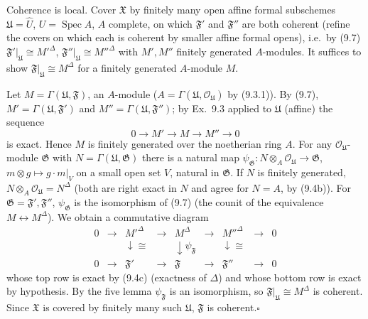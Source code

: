\documentclass[11pt]{article}
\begin{document}
\pf
Coherence is local. Cover $\mathfrak X$ by finitely many open affine formal subschemes $\mathfrak U=\widehat U$, $U=\operatorname{Spec}A$, $A$ complete, on which $\mathfrak F'$ and $\mathfrak F''$ are both coherent (refine the covers on which each is coherent by smaller affine formal opens), i.e.\ by (9.7) $\mathfrak F'|_{\mathfrak U}\cong M'^\Delta$, $\mathfrak F''|_{\mathfrak U}\cong M''^\Delta$ with $M',M''$ finitely generated $A$-modules. It suffices to show $\mathfrak F|_{\mathfrak U}\cong M^\Delta$ for a finitely generated $A$-module $M$.

Let $M=\Gamma(\mathfrak U,\mathfrak F)$, an $A$-module ($A=\Gamma(\mathfrak U,\mathcal O_{\mathfrak U})$ by (9.3.1)). By (9.7), $M'=\Gamma(\mathfrak U,\mathfrak F')$ and $M''=\Gamma(\mathfrak U,\mathfrak F'')$; by Ex.~9.3 applied to $\mathfrak U$ (affine) the sequence
\[0\to M'\to M\to M''\to0\]
is exact. Hence $M$ is finitely generated over the noetherian ring $A$. For any $\mathcal O_{\mathfrak U}$-module $\mathfrak G$ with $N=\Gamma(\mathfrak U,\mathfrak G)$ there is a natural map $\psi_{\mathfrak G}:N\otimes_A\mathcal O_{\mathfrak U}\to\mathfrak G$, $m\otimes g\mapsto g\cdot m|_V$ on a small open set $V$, natural in $\mathfrak G$. If $N$ is finitely generated, $N\otimes_A\mathcal O_{\mathfrak U}=N^\Delta$ (both are right exact in $N$ and agree for $N=A$, by (9.4b)). For $\mathfrak G=\mathfrak F',\mathfrak F''$, $\psi_{\mathfrak G}$ is the isomorphism of (9.7) (the counit of the equivalence $M\leftrightarrow M^\Delta$). We obtain a commutative diagram
\[\begin{array}{ccccccccc}0&\to&M'^\Delta&\to&M^\Delta&\to&M''^\Delta&\to&0\\&&\downarrow\cong&&\downarrow\psi_{\mathfrak F}&&\downarrow\cong&&\\0&\to&\mathfrak F'&\to&\mathfrak F&\to&\mathfrak F''&\to&0\end{array}\]
whose top row is exact by (9.4c) (exactness of $\Delta$) and whose bottom row is exact by hypothesis. By the five lemma $\psi_{\mathfrak F}$ is an isomorphism, so $\mathfrak F|_{\mathfrak U}\cong M^\Delta$ is coherent. Since $\mathfrak X$ is covered by finitely many such $\mathfrak U$, $\mathfrak F$ is coherent.\hfill$\square$
\end{document}
